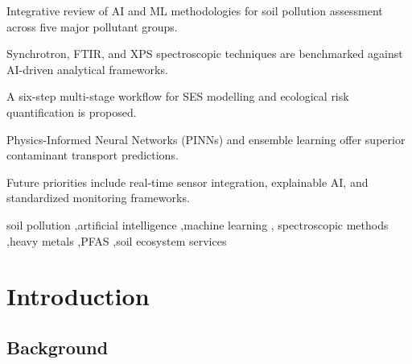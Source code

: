 \documentclass[preprint,12pt]{elsarticle}            %
\begin{document}
\begin{frontmatter}
\begin{highlights}
\item Integrative review of AI and ML methodologies for soil pollution
    assessment across five major pollutant groups.
\item Synchrotron, FTIR, and XPS spectroscopic techniques are benchmarked
    against AI-driven analytical frameworks.
\item A six-step multi-stage workflow for SES modelling and ecological risk
    quantification is proposed.
\item Physics-Informed Neural Networks (PINNs) and ensemble learning offer
    superior contaminant transport predictions.
\item Future priorities include real-time sensor integration, explainable AI,
    and standardized monitoring frameworks.
\end{highlights}

\begin{keyword}
soil pollution \sep artificial intelligence \sep machine learning \sep
spectroscopic methods \sep heavy metals \sep PFAS \sep soil ecosystem services
\end{keyword}

\end{frontmatter}


\section{Introduction}\label{sec1}

\subsection{Background}\label{sec1.1}
\end{document}

